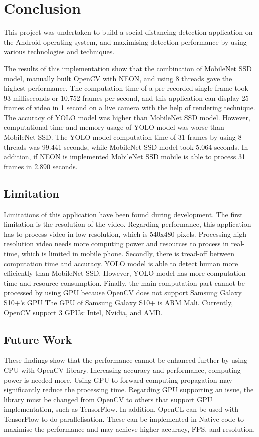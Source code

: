 \chapter{Conclusion}\label{conclusion}

    This project was undertaken to build a social distancing detection application on the Android operating system,
    and maximising detection performance by using various technologies and techniques.

    The results of this implementation show that the combination of MobileNet SSD model,
    manually built OpenCV with NEON, and using 8 threads gave the highest performance.
    The computation time of a pre-recorded single frame took 93 milliseconds or 10.752 frames per second,
    and this application can display 25 frames of video in 1 second on a live camera
    with the help of rendering technique.
    The accuracy of YOLO model was higher than MobileNet SSD model.
    However, computational time and memory usage of YOLO model was worse than MobileNet SSD.
    The YOLO model computation time of 31 frames by using 8 threads was 99.441 seconds,
    while MobileNet SSD model took 5.064 seconds.
    In addition, if NEON is implemented MobileNet SSD mobile is able to process 31 frames in 2.890 seconds.

    \section{Limitation}
        Limitations of this application have been found during development.
        The first limitation is the resolution of the video.
        Regarding performance, this application has to process video in low resolution,
        which is 540x480 pixels.
        Processing high-resolution video needs more computing power and resources to process in real-time,
        which is limited in mobile phone.
        Secondly, there is tread-off between computation time and accuracy.
        YOLO model is able to detect human more efficiently than MobileNet SSD.
        However, YOLO model has more computation time and resource consumption.
        Finally, the main computation part cannot be processed by using GPU
        because OpenCV does not support Samsung Galaxy S10+'s GPU
        The GPU of Samsung Galaxy S10+ is ARM Mali.
        Currently, OpenCV support 3 GPUs: Intel, Nvidia, and AMD.

    \section{Future Work}
        These findings show that the performance cannot be enhanced further by using CPU with OpenCV library.
        Increasing accuracy and performance, computing power is needed more.
        Using GPU to forward computing propagation may significantly reduce the processing time.
        Regarding GPU supporting an issue, the library must be changed from OpenCV to others that support
        GPU implementation, such as TensorFlow.
        In addition, OpenCL can be used with TensorFlow to do parallelisation.
        These can be implemented in Native code to maximise the performance
        and may achieve higher accuracy, FPS, and resolution.

